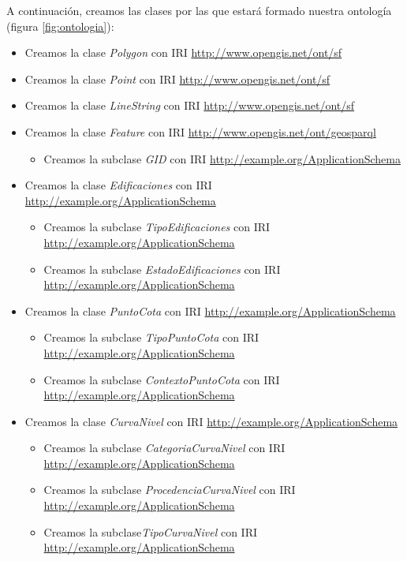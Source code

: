 A continuación, creamos las clases por las que estará formado nuestra ontología (figura \ref{fig:ontologia}):

\begin{itemize}
	\item Creamos la clase \textit{Polygon} con IRI \url{http://www.opengis.net/ont/sf}
	
	\item Creamos la clase \textit{Point} con IRI \url{http://www.opengis.net/ont/sf}
	
	\item Creamos la clase \textit{LineString} con IRI  \url{http://www.opengis.net/ont/sf}
	
	\item Creamos la clase \textit{Feature} con IRI \url{http://www.opengis.net/ont/geosparql}
	
	\begin{itemize}
		\item Creamos la subclase \textit{GID} con IRI \url{http://example.org/ApplicationSchema}
	\end{itemize}
	
	
	\item Creamos la clase \textit{Edificaciones} con IRI \url{http://example.org/ApplicationSchema}
		\begin{itemize}
	\item Creamos la subclase \textit{TipoEdificaciones} con IRI \url{http://example.org/ApplicationSchema}
	\item Creamos la subclase \textit{EstadoEdificaciones} con IRI \url{http://example.org/ApplicationSchema}
		\end{itemize}
	
	\item Creamos la clase \textit{PuntoCota} con IRI \url{http://example.org/ApplicationSchema}
		\begin{itemize}
	\item Creamos la subclase \textit{TipoPuntoCota} con IRI \url{http://example.org/ApplicationSchema}
	\item Creamos la subclase \textit{ContextoPuntoCota} con IRI \url{http://example.org/ApplicationSchema}
		\end{itemize}
	
	\item Creamos la clase \textit{CurvaNivel} con IRI \url{http://example.org/ApplicationSchema}
	
	\begin{itemize}
	\item Creamos la subclase \textit{CategoriaCurvaNivel} con IRI \url{http://example.org/ApplicationSchema}
	\item Creamos la subclase \textit{ProcedenciaCurvaNivel} con IRI \url{http://example.org/ApplicationSchema}
	\item Creamos la subclase\textit{TipoCurvaNivel} con IRI \url{ http://example.org/ApplicationSchema}
	\end{itemize}
\end{itemize}

